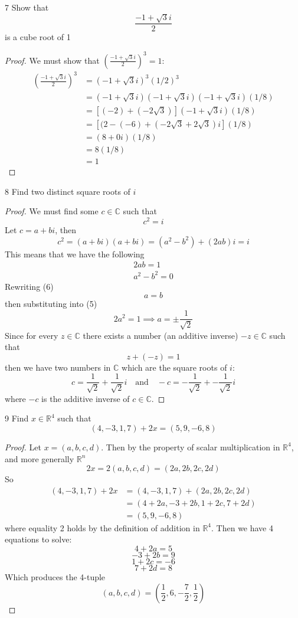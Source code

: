 \documentclass[12pt]{article}
\newenvironment{problem}[1]{\begin{prob*}{#1}{}}{\end{prob*}}
\begin{document}
\begin{problem}{7}
Show that \[\frac{-1+\sqrt{3}i}{2}\] is a cube root of 1
\end{problem}
\begin{proof}
    We must show that $(\frac{-1+\sqrt{3}i}{2})^3=1$:
    \begin{align*}
        \left(\frac{-1+\sqrt{3}i}{2}\right)^3&=(-1+\sqrt{3}i)^3(1/2)^3\\
        &=(-1+\sqrt{3}i)(-1+\sqrt{3}i)(-1+\sqrt{3}i)(1/8)\\
        &=[(-2)+(-2\sqrt{3})](-1+\sqrt{3}i)(1/8)\\
        &=[(2-(-6)+(-2\sqrt{3}+2\sqrt{3})i](1/8)\\
        &=(8+0i)(1/8)\\
        &=8(1/8)\\
        &=1
    \end{align*}
\end{proof}

\begin{problem}{8}
Find two distinct square roots of $i$
\end{problem}
\begin{proof}
    We must find some $c\in \mathbb{C}$ such that 
    \[c^2=i\]
    Let $c=a+bi$, then
    \[c^2=(a+bi)(a+bi)=(a^2-b^2)+(2ab)i=i\]
    This means that we have the following
    \begin{align}
        2ab=1\\
        a^2-b^2=0
    \end{align}
    Rewriting (6)
    \[a=b\]
    then substituting into (5)
    \[2a^2=1\implies a=\pm \frac{1}{\sqrt{2}}\]
    Since for every $z\in\mathbb{C}$ there exists a number (an additive inverse) $-z\in\mathbb{C}$ such that
    \[z+(-z)=1\]
    then we have two numbers in $\mathbb{C}$ which are the square roots of $i$:
    \[c=\frac{1}{\sqrt{2}}+\frac{1}{\sqrt{2}}i \quad \text{and} \quad -c=-\frac{1}{\sqrt{2}}+-\frac{1}{\sqrt{2}}i\]
    where $-c$ is the additive inverse of $c\in \mathbb{C}$.  
\end{proof}

\begin{problem}{9}
Find $x\in \mathbb{R}^4$ such that \[(4,-3,1,7)+2x=(5,9,-6,8)\]
\end{problem}
\begin{proof}
    Let $x=(a,b,c,d)$. Then by the property of scalar multiplication in $\mathbb{R}^4$, and more generally $\mathbb{R}^n$
    \[2x=2(a,b,c,d)=(2a,2b,2c,2d)\]
    So
    \begin{align*}
            (4,-3,1,7)+2x&=(4,-3,1,7)+(2a,2b,2c,2d)\\
            &=(4+2a,-3+2b,1+2c,7+2d)\\
            &=(5,9,-6,8)
    \end{align*}
    where equality 2 holds by the definition of addition in $\mathbb{R}^4$.
    Then we have 4 equations to solve:
    \[4+2a=5\]
    \[-3+2b=9\]
    \[1+2c=-6\]
    \[7+2d=8\]
    Which produces the 4-tuple
    \[(a,b,c,d)=(\frac{1}{2},6,-\frac{7}{2},\frac{1}{2})\]
\end{proof}
\end{document}
